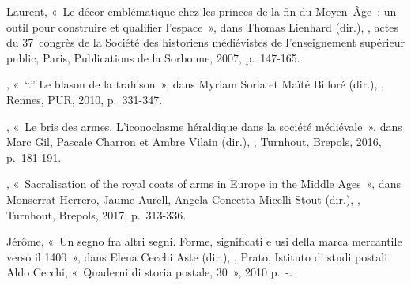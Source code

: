 \begin{teiElement}[name={TEI},change={commons\_edition}]
\begin{teiElement}[name={text},type={book},xmlid={book}]
\begin{teiElement}[name={group},type={book},xmlid={book-001}]
\begin{teiElement}[name={group},type={bibliography},data-page-title={Sources et bibliographie},data-include-href={Ch14\_Source\_bibliographie.xml},xmlid={bibliography-001}]
\begin{teiElement}[name={body}]
\begin{teiDiv}[type={section1},xmlid={div18}]
\begin{teiDiv}[type={section2},xmlid={div19}]
\begin{teiBibl}[xmlid={bibl-379}]
\end{teiBibl}
              \begin{teiBibl}[xmlid={bibl-380}]
 Laurent, « Le décor emblématique chez les princes de la fin du Moyen Âge : un outil pour construire et qualifier l’espace », dans Thomas Lienhard (dir.), , actes du 37 congrès de la Société des historiens médiévistes de l’enseignement supérieur public, Paris, Publications de la Sorbonne, 2007, p. 147-165.
\end{teiBibl}
              \begin{teiBibl}[xmlid={bibl-381}]
, « “.” Le blason de la trahison », dans Myriam Soria et Maïté Billoré (dir.), \teiHi[rend={italic}]{-}, Rennes, PUR, 2010, p. 331-347.
\end{teiBibl}
              \begin{teiBibl}[xmlid={bibl-382}]
, « Le bris des armes. L’iconoclasme héraldique dans la société médiévale », dans Marc Gil, Pascale Charron et Ambre Vilain (dir.), , Turnhout, Brepols, 2016, p. 181-191.
\end{teiBibl}
              \begin{teiBibl}[xmlid={bibl-383}]
, « Sacralisation of the royal coats of arms in Europe in the Middle Ages », dans Monserrat Herrero, Jaume Aurell, Angela Concetta Micelli Stout (dir.), , Turnhout, Brepols, 2017, p. 313-336.
\end{teiBibl}
              \begin{teiBibl}[xmlid={bibl-384}]
 Jérôme, « Un segno fra altri segni. Forme, significati e usi della marca mercantile verso il 1400 », dans Elena Cecchi Aste (dir.), , Prato, Istituto di studi postali Aldo Cecchi, « Quaderni di storia postale, 30 », 2010 p. -.

\end{teiBibl}
\end{teiDiv}
\end{teiDiv}
\end{teiElement}
\end{teiElement}
\end{teiElement}
\end{teiElement}
\end{teiElement}
